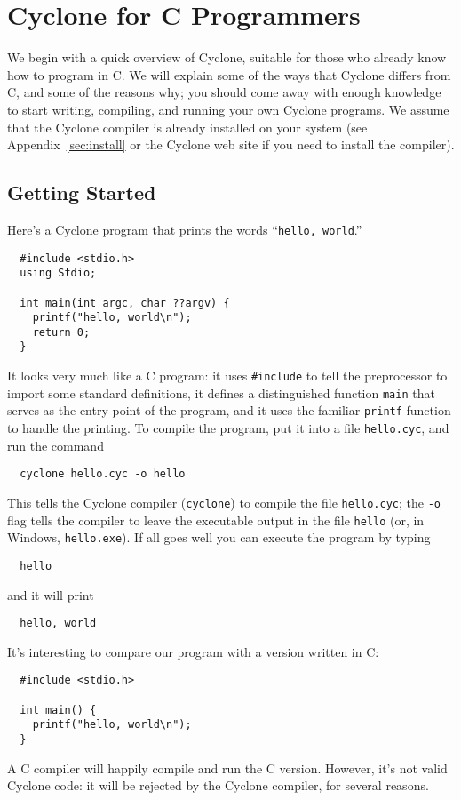 \section{Cyclone for C Programmers}

We begin with a quick overview of Cyclone, suitable for those who
already know how to program in C\@.  We will explain some of the ways
that Cyclone differs from C, and some of the reasons why; you should
come away with enough knowledge to start writing, compiling, and
running your own Cyclone programs.  We assume that the Cyclone
compiler is already installed on your system (see
Appendix~\ref{sec:install} or the Cyclone web site if you need to
install the compiler).

\subsection{Getting Started}

Here's a Cyclone program that prints the words ``\texttt{hello,
  world}.''
\begin{verbatim}
  #include <stdio.h>
  using Stdio;

  int main(int argc, char ??argv) {
    printf("hello, world\n");
    return 0;
  }
\end{verbatim}  

It looks very much like a C program: it uses \texttt{\#include} to
tell the preprocessor to import some standard definitions, it defines
a distinguished function \texttt{main} that serves as the entry point
of the program, and it uses the familiar \texttt{printf} function to
handle the printing.  To compile the program, put it into a file
\texttt{hello.cyc}, and run the command
\begin{verbatim}
  cyclone hello.cyc -o hello
\end{verbatim}
This tells the Cyclone compiler (\texttt{cyclone}) to compile the file
\texttt{hello.cyc}; the \texttt{-o} flag tells the compiler to leave
the executable output in the file \texttt{hello} (or, in Windows,
\texttt{hello.exe}).  If all goes well you can execute the program by
typing
\begin{verbatim}
  hello
\end{verbatim}
and it will print
\begin{verbatim}
  hello, world
\end{verbatim}

It's interesting to compare our program with a version written in C:
\begin{verbatim}
  #include <stdio.h>

  int main() {
    printf("hello, world\n");
  }
\end{verbatim}
A C compiler will happily compile and run the C version.  However,
it's not valid Cyclone code: it will be rejected by the Cyclone
compiler, for several reasons.

